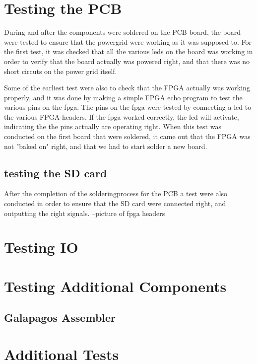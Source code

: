 \section{Testing the PCB}
During and after the components were soldered on the PCB board, the board were tested to ensure that the powergrid were working as it was supposed to.
For the first test, it was checked that all the various leds on the board was working in order to verify that the board actually was powered right, and that there was
no short circuts on the power grid itself.

Some of the earliest test were also to check that the FPGA actually was working properly, and it was done by making a simple FPGA echo program to test the various pins on the fpga.
The pins on the fpga were tested by connecting a led to the various FPGA-headers. If the fpga worked correctly, the led will activate, indicating the the pins actually are operating right.
When this test was conducted on the first board that were soldered, it came out that the FPGA was not "baked on" right, and that we had to start solder a new board. 

\subsection{testing the SD card}
After the completion of the solderingprocess for the PCB a test were also conducted in order to ensure that the 
SD card were connected right, and outputting the right signals. 
--picture of fpga headers

\section{Testing IO}


\section{Testing Additional Components}

\subsection{Galapagos Assembler}


\section{Additional Tests}


